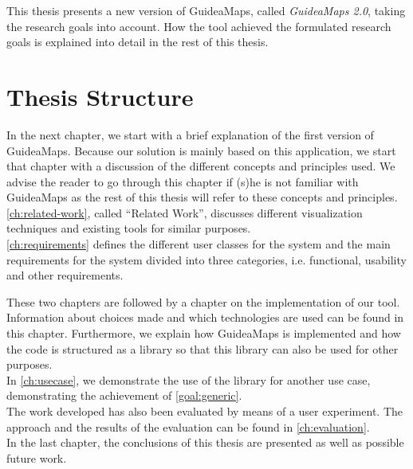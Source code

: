 This thesis presents a new version of GuideaMaps, called \textit{GuideaMaps 2.0}, taking the research goals into account. How the tool achieved the formulated research goals is explained into detail in the rest of this thesis.




\section{Thesis Structure}\label{sec:thesis-structure}
In the next chapter, we start with a brief explanation of the first version of GuideaMaps. Because our solution is mainly based on this application, we start that chapter with a discussion of the different concepts and principles used. We advise the reader to go through this chapter if (s)he is not familiar with GuideaMaps as the rest of this thesis will refer to these concepts and principles.\\

\renewcommand{\chapterautorefname}{Chapter}
\autoref{ch:related-work}, called ``Related Work'', discusses different visualization techniques and existing tools for similar purposes.\\

\autoref{ch:requirements} defines the different user classes for the system and the main requirements for the system divided into three categories, i.e. functional, usability and other requirements.\\
\renewcommand{\chapterautorefname}{chapter}

These two chapters are followed by a chapter on the implementation of our tool. Information about choices made and which technologies are used can be found in this chapter. Furthermore, we explain how GuideaMaps is implemented and how the code is structured as a library so that this library can also be used for other purposes.\\ 

In \autoref{ch:usecase}, we demonstrate the use of the library for another use case, demonstrating the achievement of \ref{goal:generic}.\\

The work developed has also been evaluated by means of a user experiment. The approach and the results of the evaluation can be found in \autoref{ch:evaluation}.\\

In the last chapter, the conclusions of this thesis are presented as well as possible future work.



